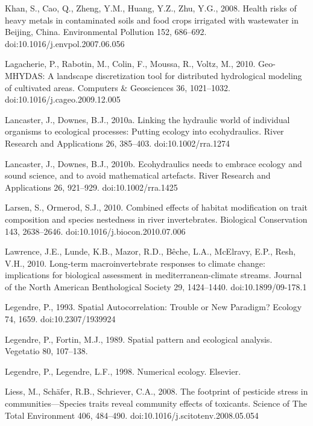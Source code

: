 \begin{thebibliography}
\bibitem{} \hangindent=1cm Khan, S., Cao, Q., Zheng, Y.M., Huang, Y.Z., Zhu, Y.G., 2008. Health risks of heavy metals in contaminated soils and food crops irrigated with wastewater in Beijing, China. Environmental Pollution 152, 686–692. doi:10.1016/j.envpol.2007.06.056

\bibitem{} \hangindent=1cm Lagacherie, P., Rabotin, M., Colin, F., Moussa, R., Voltz, M., 2010. Geo-MHYDAS: A landscape discretization tool for distributed hydrological modeling of cultivated areas. Computers & Geosciences 36, 1021–1032. doi:10.1016/j.cageo.2009.12.005

\bibitem{} \hangindent=1cm Lancaster, J., Downes, B.J., 2010a. Linking the hydraulic world of individual organisms to ecological processes: Putting ecology into ecohydraulics. River Research and Applications 26, 385–403. doi:10.1002/rra.1274

\bibitem{} \hangindent=1cm Lancaster, J., Downes, B.J., 2010b. Ecohydraulics needs to embrace ecology and sound science, and to avoid mathematical artefacts. River Research and Applications 26, 921–929. doi:10.1002/rra.1425

\bibitem{} \hangindent=1cm Larsen, S., Ormerod, S.J., 2010. Combined effects of habitat modification on trait composition and species nestedness in river invertebrates. Biological Conservation 143, 2638–2646. doi:10.1016/j.biocon.2010.07.006

\bibitem{} \hangindent=1cm Lawrence, J.E., Lunde, K.B., Mazor, R.D., Bêche, L.A., McElravy, E.P., Resh, V.H., 2010. Long-term macroinvertebrate responses to climate change: implications for biological assessment in mediterranean-climate streams. Journal of the North American Benthological Society 29, 1424–1440. doi:10.1899/09-178.1

\bibitem{} \hangindent=1cm Legendre, P., 1993. Spatial Autocorrelation: Trouble or New Paradigm? Ecology 74, 1659. doi:10.2307/1939924

\bibitem{} \hangindent=1cm Legendre, P., Fortin, M.J., 1989. Spatial pattern and ecological analysis. Vegetatio 80, 107–138.

\bibitem{} \hangindent=1cm Legendre, P., Legendre, L.F., 1998. Numerical ecology. Elsevier.

\bibitem{} \hangindent=1cm Liess, M., Schäfer, R.B., Schriever, C.A., 2008. The footprint of pesticide stress in communities—Species traits reveal community effects of toxicants. Science of The Total Environment 406, 484–490. doi:10.1016/j.scitotenv.2008.05.054


\end{thebibliography}
